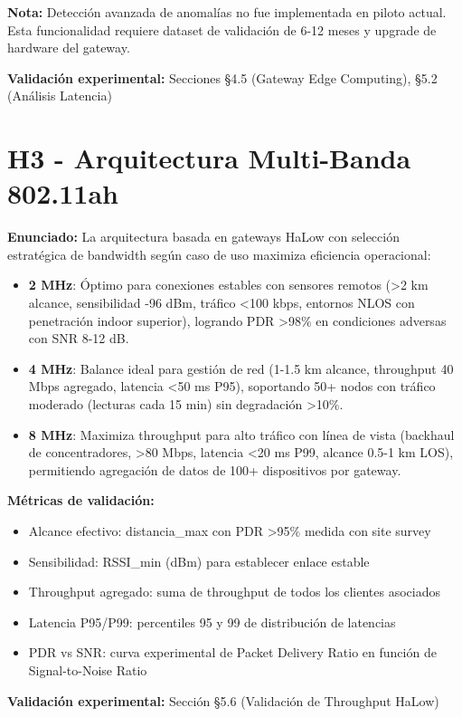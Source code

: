 \textbf{Nota:} Detección avanzada de anomalías no fue implementada en piloto actual. Esta funcionalidad requiere dataset de validación de 6-12 meses y upgrade de hardware del gateway.

\textbf{Validación experimental:} Secciones §4.5 (Gateway Edge Computing), §5.2 (Análisis Latencia)

\section{H3 - Arquitectura Multi-Banda 802.11ah}

\textbf{Enunciado:} La arquitectura basada en gateways HaLow con selección estratégica de bandwidth según caso de uso maximiza eficiencia operacional:
\begin{itemize}
\item \textbf{2 MHz}: Óptimo para conexiones estables con sensores remotos (>2 km alcance, sensibilidad -96 dBm, tráfico <100 kbps, entornos NLOS con penetración indoor superior), logrando PDR >98\% en condiciones adversas con SNR 8-12 dB.
\item \textbf{4 MHz}: Balance ideal para gestión de red (1-1.5 km alcance, throughput 40 Mbps agregado, latencia <50 ms P95), soportando 50+ nodos con tráfico moderado (lecturas cada 15 min) sin degradación >10\%.
\item \textbf{8 MHz}: Maximiza throughput para alto tráfico con línea de vista (backhaul de concentradores, >80 Mbps, latencia <20 ms P99, alcance 0.5-1 km LOS), permitiendo agregación de datos de 100+ dispositivos por gateway.
\end{itemize}

\textbf{Métricas de validación:}
\begin{itemize}
\item Alcance efectivo: distancia\_max con PDR >95\% medida con site survey
\item Sensibilidad: RSSI\_min (dBm) para establecer enlace estable
\item Throughput agregado: suma de throughput de todos los clientes asociados
\item Latencia P95/P99: percentiles 95 y 99 de distribución de latencias
\item PDR vs SNR: curva experimental de Packet Delivery Ratio en función de Signal-to-Noise Ratio
\end{itemize}

\textbf{Validación experimental:} Sección §5.6 (Validación de Throughput HaLow)

